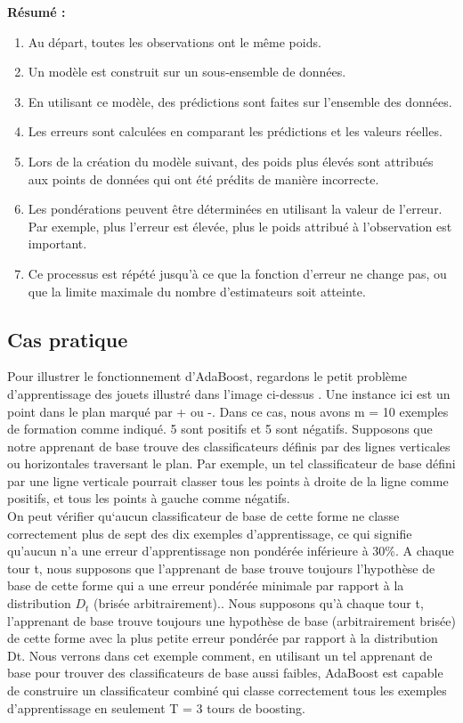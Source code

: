 \documentclass[french,a4paper,12pt]{article}
\begin{document}
 


 \textbf{Résumé : } 

 \begin{enumerate}
    \item  Au départ, toutes les observations ont le même poids.
    \item Un modèle est construit sur un sous-ensemble de données.
    \item En utilisant ce modèle, des prédictions sont faites sur l'ensemble des données.
    \item Les erreurs sont calculées en comparant les prédictions et les valeurs réelles.
    \item Lors de la création du modèle suivant, des poids plus élevés sont attribués aux points de données qui ont été prédits de manière incorrecte.
    \item 
Les pondérations peuvent être déterminées en utilisant la valeur de l'erreur. Par exemple, plus l'erreur est élevée, plus le poids attribué à l'observation est important.
\item  Ce processus est répété jusqu'à ce que la fonction d'erreur ne change pas, ou que la limite maximale du nombre d'estimateurs soit atteinte.
 \end{enumerate}

 \subsection{Cas pratique } 


 

 \quad Pour illustrer le fonctionnement d'AdaBoost, regardons le petit problème d'apprentissage des jouets illustré dans l'image ci-dessus \citep{schapire}. Une instance ici est un point dans le plan marqué par + ou -. Dans ce cas, nous avons m = 10 exemples de formation comme indiqué. 5 sont positifs et 5 sont négatifs. 
 \quad Supposons que notre apprenant de base trouve des classificateurs définis par des lignes verticales ou horizontales traversant le plan. Par exemple, un tel classificateur de base défini par une ligne verticale pourrait classer tous les points à droite de la ligne comme positifs, et tous les points à gauche comme négatifs. \\
On peut vérifier qu`aucun classificateur de base de cette forme ne classe correctement plus de sept des dix exemples d'apprentissage, ce qui signifie qu'aucun n'a une erreur d'apprentissage non pondérée inférieure à 30\%. A chaque tour t, nous supposons que l'apprenant de base trouve toujours l'hypothèse de base de cette forme qui a une erreur pondérée minimale par rapport à la distribution $D_t$ (brisée arbitrairement).. Nous supposons qu'à chaque tour t, l'apprenant de base trouve toujours une hypothèse de base (arbitrairement brisée) de cette forme avec la plus petite erreur pondérée par rapport à la distribution Dt. Nous verrons dans cet exemple comment, en utilisant un tel apprenant de base pour trouver des classificateurs de base aussi faibles, AdaBoost est capable de construire un classificateur combiné qui classe correctement tous les exemples d'apprentissage en seulement T = 3 tours de boosting. \\
\end{document}
